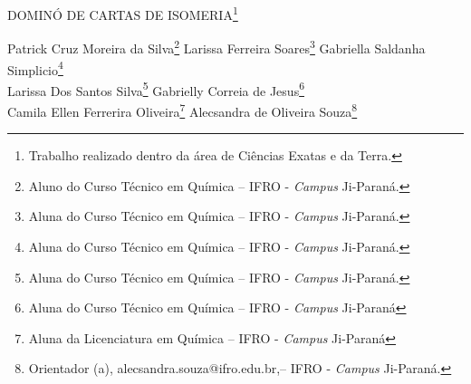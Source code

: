\documentclass[article,12pt,onesidea,4paper,english,brazil]{abntex2}
\begin{document}
	
	
	\frenchspacing 
	
	\begin{center}
		\LARGE DOMINÓ DE CARTAS DE ISOMERIA\footnote{Trabalho realizado dentro da área de Ciências Exatas e da Terra.}
		
		\normalsize
		Patrick Cruz Moreira da Silva\footnote{Aluno do Curso Técnico em Química – IFRO - \textit{Campus} Ji-Paraná.} 
		Larissa Ferreira Soares\footnote{Aluna do Curso Técnico em Química – IFRO - \textit{Campus} Ji-Paraná.} 
		Gabriella Saldanha Simplicio\footnote{Aluna do Curso Técnico em Química – IFRO - \textit{Campus} Ji-Paraná.} \\
		Larissa Dos Santos Silva\footnote{Aluna do Curso Técnico em Química – IFRO - \textit{Campus} Ji-Paraná.}
		Gabrielly Correia de Jesus\footnote{Aluna do Curso Técnico em Química – IFRO - \textit{Campus} Ji-Paraná}\\
		Camila Ellen Ferrerira Oliveira\footnote{Aluna da Licenciatura em Química – IFRO - \textit{Campus} Ji-Paraná}
		Alecsandra de Oliveira Souza\footnote{Orientador (a), alecsandra.souza@ifro.edu.br,– IFRO - \textit{Campus} Ji-Paraná.} 
	\end{center}
	
\end{document}
